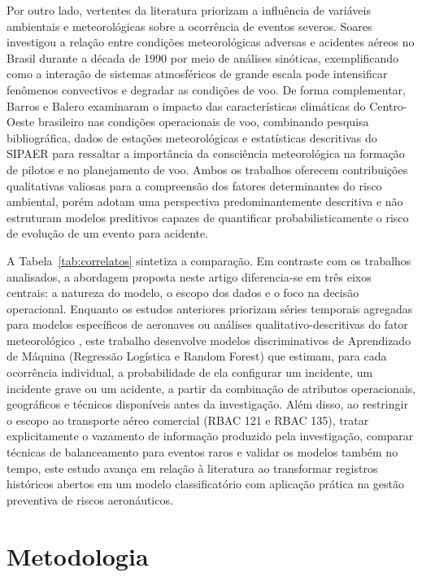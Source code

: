 \documentclass[12pt]{article}
\begin{document}
Por outro lado, vertentes da literatura priorizam a influência de variáveis ambientais e meteorológicas sobre a ocorrência de eventos severos. Soares \cite{soares:2012} investigou a relação entre condições meteorológicas adversas e acidentes aéreos no Brasil durante a década de 1990 por meio de análises sinóticas, exemplificando como a interação de sistemas atmosféricos de grande escala pode intensificar fenômenos convectivos e degradar as condições de voo. De forma complementar, Barros e Balero \cite{barros:2012} examinaram o impacto das características climáticas do Centro-Oeste brasileiro nas condições operacionais de voo, combinando pesquisa bibliográfica, dados de estações meteorológicas e estatísticas descritivas do SIPAER para ressaltar a importância da consciência meteorológica na formação de pilotos e no planejamento de voo. Ambos os trabalhos oferecem contribuições qualitativas valiosas para a compreensão dos fatores determinantes do risco ambiental, porém adotam uma perspectiva predominantemente descritiva e não estruturam modelos preditivos capazes de quantificar probabilisticamente o risco de evolução de um evento para acidente.

A Tabela~\ref{tab:correlatos} sintetiza a comparação. Em contraste com os trabalhos analisados, a abordagem proposta neste artigo diferencia-se em três eixos centrais: a natureza do modelo, o escopo dos dados e o foco na decisão operacional. Enquanto os estudos anteriores priorizam séries temporais agregadas para modelos específicos de aeronaves \cite{reinert:2023} ou análises qualitativo-descritivas do fator meteorológico \cite{soares:2012,barros:2012}, este trabalho desenvolve modelos discriminativos de Aprendizado de Máquina (Regressão Logística e Random Forest) que estimam, para cada ocorrência individual, a probabilidade de ela configurar um incidente, um incidente grave ou um acidente, a partir da combinação de atributos operacionais, geográficos e técnicos disponíveis antes da investigação. Além disso, ao restringir o escopo ao transporte aéreo comercial (RBAC 121 e RBAC 135), tratar explicitamente o vazamento de informação produzido pela investigação, comparar técnicas de balanceamento para eventos raros e validar os modelos também no tempo, este estudo avança em relação à literatura ao transformar registros históricos abertos em um modelo classificatório com aplicação prática na gestão preventiva de riscos aeronáuticos.


\section{Metodologia}
\label{sec:metodo}
\end{document}
